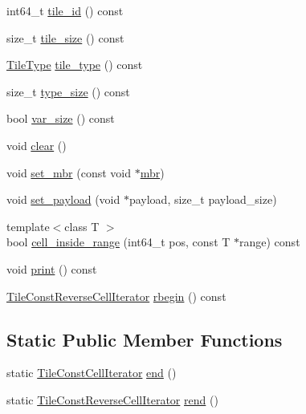 \begin{DoxyCompactItemize}
int64\+\_\+t \hyperlink{classTile_a41572d582ec47de8eaff0d6f508bfdb7}{tile\+\_\+id} () const 
\item 
size\+\_\+t \hyperlink{classTile_aa292b34431a96758252c73fb9fbec8bc}{tile\+\_\+size} () const 
\item 
\hyperlink{classTile_a4d24e5edfa7092e2fd2d0f772e3e1433}{Tile\+Type} \hyperlink{classTile_a65f8d7269084614c9213d3aaa57d7d29}{tile\+\_\+type} () const 
\item 
size\+\_\+t \hyperlink{classTile_aad6fdbdb70d35595e930c79aa95dd83d}{type\+\_\+size} () const 
\item 
bool \hyperlink{classTile_ad0d61569489c2c6df4ddf6b586a23c60}{var\+\_\+size} () const 
\item 
void \hyperlink{classTile_a8f482bab4aa537311f8948f225c915a4}{clear} ()
\item 
void \hyperlink{classTile_a6c3353f328bbcc9e5fcf79f35cd419ed}{set\+\_\+mbr} (const void $\ast$\hyperlink{classTile_a9cdd79143a4315ae3ace98433738cae6}{mbr})
\item 
void \hyperlink{classTile_af912f364dcaef9cecdd8c8066a11a3f2}{set\+\_\+payload} (void $\ast$payload, size\+\_\+t payload\+\_\+size)
\item 
{\footnotesize template$<$class T $>$ }\\bool \hyperlink{classTile_a8ff1dc463bfaa8c0a831bd09e35dc580}{cell\+\_\+inside\+\_\+range} (int64\+\_\+t pos, const T $\ast$range) const 
\item 
void \hyperlink{classTile_a28b31e117331048eba61c68b46b98bb8}{print} () const 
\item 
\hyperlink{classTileConstReverseCellIterator}{Tile\+Const\+Reverse\+Cell\+Iterator} \hyperlink{classTile_a35b9f2b4d2603b953cb7128ae62ab8b1}{rbegin} () const 
\end{DoxyCompactItemize}
\subsection*{Static Public Member Functions}
\begin{DoxyCompactItemize}
\item 
static \hyperlink{classTileConstCellIterator}{Tile\+Const\+Cell\+Iterator} \hyperlink{classTile_addbf441c599c6761fcd510d335209841}{end} ()
\item 
static \hyperlink{classTileConstReverseCellIterator}{Tile\+Const\+Reverse\+Cell\+Iterator} \hyperlink{classTile_a36acfc2f19d141e4c376b6ef0b3e0fd5}{rend} ()
\end{DoxyCompactItemize}
